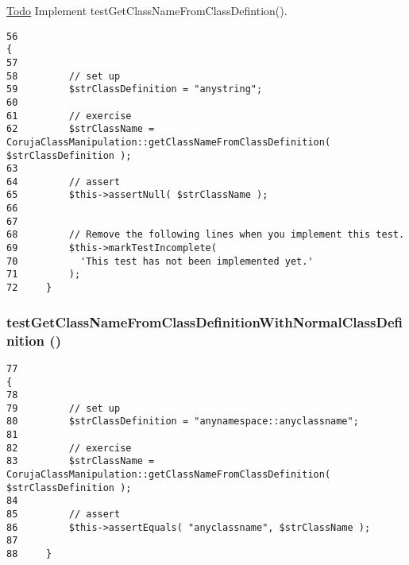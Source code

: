 \begin{Desc}
\item[\hyperlink{todo__todo000007}{Todo}]Implement testGetClassNameFromClassDefintion(). \end{Desc}


\begin{Code}\begin{verbatim}56                                                                        {
57 
58         // set up
59         $strClassDefinition = "anystring";
60 
61         // exercise
62         $strClassName = CorujaClassManipulation::getClassNameFromClassDefinition( $strClassDefinition );
63 
64         // assert
65         $this->assertNull( $strClassName );
66 
67         
68         // Remove the following lines when you implement this test.
69         $this->markTestIncomplete(
70           'This test has not been implemented yet.'
71         );
72     }
\end{verbatim}
\end{Code}


\hypertarget{class_coruja_class_manipulation_test_f19b18a638ca93d790998e4641a03f5c}{
\subsubsection[{testGetClassNameFromClassDefinitionWithNormalClassDefinition}]{\setlength{\rightskip}{0pt plus 5cm}testGetClassNameFromClassDefinitionWithNormalClassDefinition ()}}
\label{class_coruja_class_manipulation_test_f19b18a638ca93d790998e4641a03f5c}




\begin{Code}\begin{verbatim}77                                                                                    {
78 
79         // set up
80         $strClassDefinition = "anynamespace::anyclassname";
81 
82         // exercise
83         $strClassName = CorujaClassManipulation::getClassNameFromClassDefinition( $strClassDefinition );
84 
85         // assert
86         $this->assertEquals( "anyclassname", $strClassName );
87 
88     }
\end{verbatim}
\end{Code}


